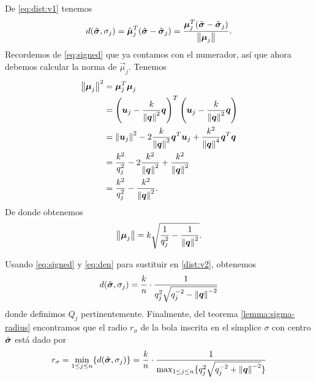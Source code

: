 De \eqref{eq:dist:v1} tenemos
\begin{equation}
	\label{dist:v2}
	d(\hat{\boldsymbol{ \sigma }}, \sigma_j) = \hat{\boldsymbol{\mu}}_j^T(\hat{\boldsymbol{ \sigma }} - \hat{\boldsymbol{ \sigma }}_j)
	= \frac{\boldsymbol{\mu}_j^T(\hat{\boldsymbol{ \sigma }} - \hat{\boldsymbol{ \sigma }}_j)}{\left\lVert \boldsymbol{\mu}_j \right\rVert}.
\end{equation}
Recordemos de \eqref{eq:signed} que ya contamos con el numerador, así que ahora debemos calcular la
norma de $\vec{\mu}_j$. Tenemos
\begin{align*}
	\left\lVert \boldsymbol{\mu}_j \right\rVert^2
	&= \boldsymbol{\mu}_j^T\boldsymbol{\mu}_j \\
	&=
	\left(\boldsymbol{u}_j - \frac{k}{\left\lVert \boldsymbol{q} \right\rVert^2}\boldsymbol{q}\right)^T
	\left(\boldsymbol{u}_j - \frac{k}{\left\lVert \boldsymbol{q} \right\rVert^2}\boldsymbol{q}\right) \\
	&=
	\left\lVert \boldsymbol{u}_j \right\rVert^2 - 2\frac{k}{\left\lVert \boldsymbol{q} \right\rVert^2}\boldsymbol{q}^T\boldsymbol{u}_j +
	\frac{k^2}{\left\lVert \boldsymbol{q} \right\rVert^4}\boldsymbol{q}^T\boldsymbol{q} \\
	&= \frac{k^2}{q_j^2} - 2\frac{k^2}{\left\lVert \boldsymbol{q} \right\rVert^2} + \frac{k^2}{\left\lVert \boldsymbol{q} \right\rVert^2} \\
	&= \frac{k^2}{q_j^2} - \frac{k^2}{\left\lVert \boldsymbol{q} \right\rVert^2}.
\end{align*}
De donde obtenemos
\begin{equation}
	\label{eq:den}
	\left\lVert \boldsymbol{\mu}_j \right\rVert = k\sqrt{\frac{1}{q_j^2} - \frac{1}{\left\lVert \boldsymbol{q} \right\rVert^2}}.
\end{equation}

Usando \eqref{eq:signed} y \eqref{eq:den} para sustituir en \eqref{dist:v2}, obtenemos
\begin{equation*}
	d(\hat{\boldsymbol{ \sigma }}, \sigma_j) = \frac{k}{n} \cdot
	\frac{1}{q_j^2\sqrt{q_j^{-2} - \left\lVert \boldsymbol{q} \right\rVert^{-2}}}
\end{equation*}
donde definimos $Q_j$ pertinentemente. Finalmente, del teorema \ref{lemma:sigma-radius} encontramos que
el radio $r_\sigma$ de la bola inscrita en el símplice $\sigma$ con centro
$\hat{\boldsymbol{ \sigma }}$ está dado por
\begin{equation}
	\label{eq:sigma-radius}
	r_\sigma = \min_{1 \leq j \leq n} \lbrace d(\hat{\boldsymbol{ \sigma }}, \sigma_j) \rbrace = \frac{k}{n} \cdot
	\frac{1}{\max_{1 \leq j \leq n} \lbrace  q_j^2\sqrt{q_j^{-2} + \left\lVert \boldsymbol{q} \right\rVert^{-2}} \rbrace}
\end{equation}

